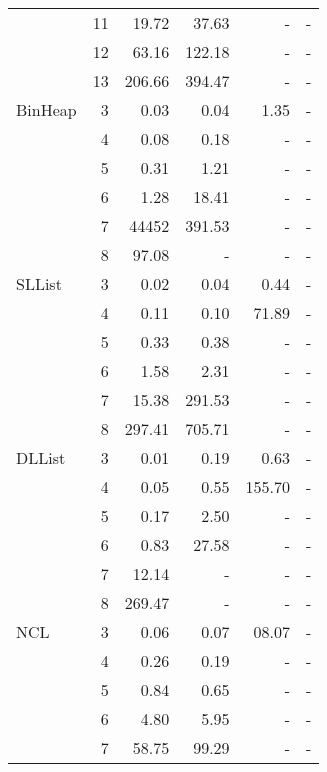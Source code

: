 \begin{table}[H]
\begin{tabular}{ l r | r | r | r | r  }
&	11	&	19.72	&	37.63	&	-	&	-	\\
&	12	&	63.16	&	122.18	&	-	&	-	\\
&	13	&	206.66	&	394.47	&	-	&	-	\\
  \midrule
  BinHeap
&	3	&	0.03	&	0.04	&	1.35	&	-	\\
&	4	&	0.08	&	0.18	&	-	&	-	\\
&	5	&	0.31	&	1.21	&	-	&	-	\\
&	6	&	1.28	&	18.41	&	-	&	-	\\
&	7	&	44452	&	391.53	&	-	&	-	\\
&	8	&	97.08	&	-	&	-	&	-	\\
  \midrule
  SLList
&	3	&	0.02	&	0.04	&	0.44	&	- \\
&	4	&	0.11	&	0.10	&	71.89	&	-	\\
&	5	&	0.33	&	0.38	&	-	&	-	\\
&	6	&	1.58	&	2.31	&	-	&	-	\\
&	7	&	15.38	&	291.53	&	-	&	-	\\
&	8	&	297.41	&	705.71	&	-	&	-	\\
  \midrule
  DLList
&	3	&	0.01	&	0.19	&	0.63	&	-	\\
&	4	&	0.05	&	0.55	&	155.70	&	-	\\
&	5	&	0.17	&	2.50	&	-	&	-	\\
&	6	&	0.83	&	27.58	&	-	&	-	\\
&	7	&	12.14	&	-	&	-	&	-	\\
&	8	&	269.47	&	-	&	-	&	-	\\
  \midrule
  NCL
&	3	&	0.06	&	0.07	&	08.07	&	-	\\
&	4	&	0.26	&	0.19	&	-	&	-	\\
&	5	&	0.84	&	0.65	&	-	&	-	\\
&	6	&	4.80	&	5.95	&	-	&	-	\\
&	7	&	58.75	&	99.29	&	-	&	-	\\
  \bottomrule
\end{tabular}
\end{table}

